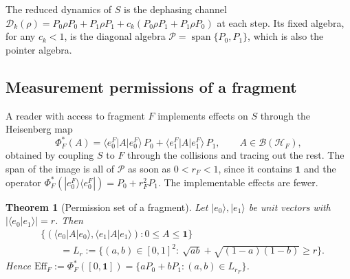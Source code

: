 \documentclass[12pt,a4paper]{article}
\newtheorem{theorem}{Theorem}[section]
\begin{document}
The reduced dynamics of $S$ is the dephasing channel $\mathcal D_k(\rho)=P_0\rho P_0+P_1\rho P_1+c_k(P_0\rho P_1+P_1\rho P_0)$ at each step. Its fixed algebra, for any $c_k<1$, is the diagonal algebra $\mathcal P=\operatorname{span}\{P_0,P_1\}$, which is also the pointer algebra.

\subsection{Measurement permissions of a fragment}

A reader with access to fragment $F$ implements effects on $S$ through the Heisenberg map
\begin{equation}
\Phi_F^*(A)=\langle e_0^F|A|e_0^F\rangle\,P_0+\langle e_1^F|A|e_1^F\rangle\,P_1,
\qquad A\in\mathcal B(\mathcal H_F),
\label{eq:fragment-map}
\end{equation}
obtained by coupling $S$ to $F$ through the collisions and tracing out the rest. The span of the image is all of $\mathcal P$ as soon as $0<r_F<1$, since it contains $\mathbf 1$ and the operator $\Phi_F^*(|e_0^F\rangle\langle e_0^F|)=P_0+r_F^2P_1$. The implementable effects are fewer.

\begin{theorem}[Permission set of a fragment]
\label{thm:lens}
Let $|e_0\rangle,|e_1\rangle$ be unit vectors with $|\langle e_0|e_1\rangle|=r$. Then
\begin{align*}
&\bigl\{(\langle e_0|A|e_0\rangle,\langle e_1|A|e_1\rangle):0\le A\le\mathbf 1\bigr\}\\
&\qquad=L_r:=\bigl\{(a,b)\in[0,1]^2:\ \sqrt{ab}+\sqrt{(1-a)(1-b)}\ge r\bigr\}.
\end{align*}
Hence $\mathrm{Eff}_F:=\Phi_F^*([0,\mathbf 1])=\{aP_0+bP_1:(a,b)\in L_{r_F}\}$.
\end{theorem}
\end{document}
